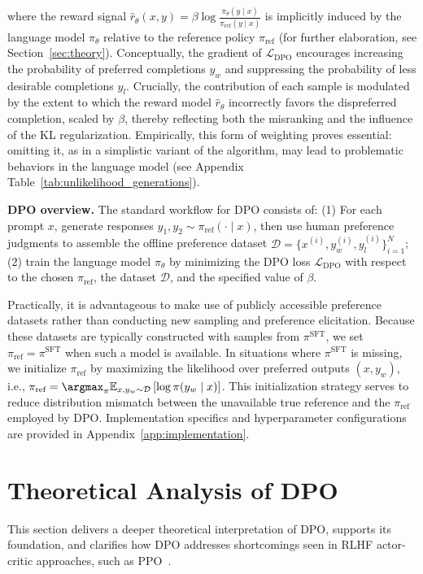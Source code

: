 where the reward signal $\hat{r}_\theta(x, y) = \beta \log \frac{\pi_\theta(y \mid x)}{\pi_\text{ref}(y \mid x)}$ is implicitly induced by the language model $\pi_\theta$ relative to the reference policy $\pi_\text{ref}$ (for further elaboration, see Section~\ref{sec:theory}). Conceptually, the gradient of $\mathcal{L}_\text{DPO}$ encourages increasing the probability of preferred completions $y_w$ and suppressing the probability of less desirable completions $y_l$. Crucially, the contribution of each sample is modulated by the extent to which the reward model $\hat{r}_\theta$ incorrectly favors the dispreferred completion, scaled by $\beta$, thereby reflecting both the misranking and the influence of the KL regularization. Empirically, this form of weighting proves essential: omitting it, as in a simplistic variant of the algorithm, may lead to problematic behaviors in the language model (see Appendix Table~\ref{tab:unlikelihood_generations}).

\textbf{DPO overview.} The standard workflow for DPO consists of: (1) For each prompt $x$, generate responses $y_1, y_2 \sim \pi_\text{ref}(\cdot \mid x)$, then use human preference judgments to assemble the offline preference dataset $\mathcal{D} = \{x^{(i)}, y_w^{(i)}, y_l^{(i)}\}_{i=1}^N$; (2) train the language model $\pi_\theta$ by minimizing the DPO loss $\mathcal{L}_\text{DPO}$ with respect to the chosen $\pi_\text{ref}$, the dataset $\mathcal{D}$, and the specified value of $\beta$.

Practically, it is advantageous to make use of publicly accessible preference datasets rather than conducting new sampling and preference elicitation. Because these datasets are typically constructed with samples from $\pi^\text{SFT}$, we set $\pi_\text{ref} = \pi^\text{SFT}$ when such a model is available. In situations where $\pi^\text{SFT}$ is missing, we initialize $\pi_\text{ref}$ by maximizing the likelihood over preferred outputs ${(x, y_w)}$, i.e., ${\pi_\text{ref} = \argmax_{\pi}\mathbb{E}_{x, y_w \sim \mathcal{D}}\left[\log \pi(y_w \mid x)\right]}$. This initialization strategy serves to reduce distribution mismatch between the unavailable true reference and the $\pi_\text{ref}$ employed by DPO. Implementation specifics and hyperparameter configurations are provided in Appendix~\ref{app:implementation}.

\section{Theoretical Analysis of DPO}
This section delivers a deeper theoretical interpretation of DPO, supports its foundation, and clarifies how DPO addresses shortcomings seen in RLHF actor-critic approaches, such as PPO~\cite{schulman2017proximal}.

